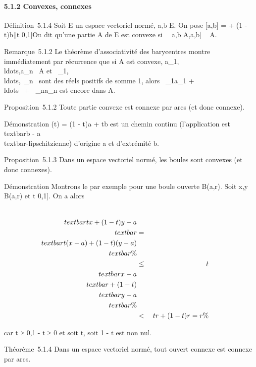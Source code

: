 \documentclass[]{article}
\begin{document}
\paragraph{5.1.2 Convexes, connexes}

Définition~5.1.4 Soit E un espace vectoriel normé, a,b \in E. On pose
{[}a,b{]} = \ta + (1 - t)b∣t
\in {[}0,1{]}\. On dit qu'une partie A de E est convexe
si \forall~~a,b \in A,\quad {[}a,b{]} \subset~
A.

Remarque~5.1.2 Le théorème d'associativité des barycentres montre
immédiatement par récurrence que si A est convexe,
a\_1,\\ldots,a\_n~
\in A et
\lambda~\_1,\\ldots,\lambda~\_n~
sont des réels positifs de somme 1, alors \lambda~\_1a\_1 +
\\ldots~ +
\lambda~\_na\_n est encore dans A.

Proposition~5.1.2 Toute partie convexe est connexe par arcs (et donc
connexe).

Démonstration \gamma(t) = (1 - t)a + tb est un chemin continu (l'application
est \\textbar{}b -
a\\textbar{}-lipschitzienne) d'origine a et d'extrémité
b.

Proposition~5.1.3 Dans un espace vectoriel normé, les boules sont
convexes (et donc connexes).

Démonstration Montrons le par exemple pour une boule ouverte B(a,r).
Soit x,y \in B(a,r) et t \in {[}0,1{]}. On a alors

\begin{align*} \\textbar{}tx + (1 -
t)y - a\\textbar{}& =& \\textbar{}t(x -
a) + (1 - t)(y - a)\\textbar{}\%&
\\ & \leq& t\\textbar{}x -
a\\textbar{} + (1 - t)\\textbar{}y -
a\\textbar{} \%& \\ &
\textless{}& tr + (1 - t)r = r \%& \\
\end{align*}

car t ≥ 0,1 - t ≥ 0 et soit t, soit 1 - t est non nul.

Théorème~5.1.4 Dans un espace vectoriel normé, tout ouvert connexe est
connexe par arcs.
\end{document}
